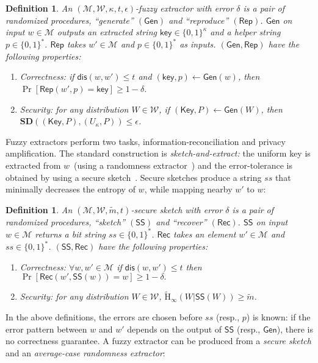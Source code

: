 \documentclass[11pt]{article}
\newcommand{\class}[1]{{\ensuremath{\mathsf{#1}}}}
\newcommand{\key}{\ensuremath{\class{key}}\xspace}
\newcommand{\Key}{\ensuremath{\class{Key}}\xspace}
\newcommand{\gen}{\ensuremath{\class{Gen}}\xspace}
\newcommand{\rep}{\ensuremath{\class{Rep}}\xspace}
\newcommand{\sketch}{\ensuremath{\class{SS}}\xspace}
\newcommand{\rec}{\ensuremath{\class{Rec}}\xspace}
\newcommand{\dis}{\ensuremath{\mathsf{dis}}}
\newcommand{\Hav}{\tilde{\mathrm{H}}_\infty}
\newcommand{\sd}{\ensuremath{\mathbf{SD}}}
\newtheorem{definition}[theorem]{Definition}
\begin{document}
\begin{definition}
\label{def:fuzzy extractor}
An $(\mathcal{M}, \mathcal{W}, \kappa, t, \epsilon)$-\emph{fuzzy extractor} with error $\delta$ is a pair of randomized procedures, ``generate'' $(\gen)$ and ``reproduce'' $(\rep)$. \gen on input $w\in \mathcal{M}$ outputs an extracted string $\key \in\{0,1\}^\kappa$ and a helper string $p\in\{0,1\}^*$. \rep takes $w'\in\mathcal{M}$ and $p\in\{0,1\}^*$ as inputs.   $(\gen, \rep)$ have the following properties:
\begin{enumerate}
\item \emph{Correctness:} if $\dis(w, w')\leq t$ and $(\key, p)\leftarrow \gen(w)$, then $\Pr[\rep( w', p) = \key] \geq 1-\delta$.
\item \emph{Security:} for any distribution $W\in\mathcal{W}$, if $(\Key,P)\leftarrow\gen (W)$, then $\sd((\Key,P),(U_\kappa,P))\leq \epsilon$.
\end{enumerate}
\end{definition}

\noindent
Fuzzy extractors perform two tasks, information-reconciliation and privacy amplification.  The standard construction is \emph{sketch-and-extract:} the uniform key is extracted from $w$~(using a randomness extractor~\cite{nisan1993randomness}) and the error-tolerance is obtained by using a secure sketch~\cite[Lemma 4.1]{DBLP:journals/siamcomp/DodisORS08}.  Secure sketches produce a string $ss$ that minimally decreases the entropy of $w$, while mapping nearby $w'$ to $w$:
\begin{definition}
\label{def:secure sketch}
An $(\mathcal{M},\mathcal{W}, \tilde{m}, t)$-\emph{secure sketch} with error $\delta$ is a pair of randomized procedures, ``sketch'' $(\sketch)$ and ``recover'' $(\rec)$.  \sketch on input $w\in\mathcal{M}$ returns a bit string $ss\in\{0,1\}^*$.  \rec takes an element $w'\in\mathcal{M}$ and $ss\in\{0,1\}^*$.  $(\sketch, \rec)$ have the following properties:
\begin{enumerate}
\item \emph{Correctness}: $ \forall w, w'\in\mathcal{M}$ if $\dis(w,w')\leq t$ then $\Pr[\rec(w',\sketch(w))=w]\geq 1-\delta.$
\item \emph{Security}: for any distribution $W\in\mathcal{W}$, $\Hav(W|\sketch(W))\geq \tilde{m}$.
\end{enumerate}
\end{definition}

\noindent In the above definitions, the errors are chosen before $ss$ (resp., $p$) is known: if the error pattern between $w$ and $w'$ depends on the output of $\sketch$ (resp., $\gen$),  there is no correctness guarantee.  
A fuzzy extractor can be produced from a \emph{secure sketch} and an \emph{average-case randomness extractor}:
\end{document}
